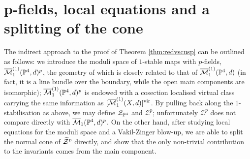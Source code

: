 \section{p-fields, local equations and a splitting of the cone}\label{sec:techniques}

The indirect approach to the proof of Theorem \ref{thm:redvscusp} can be outlined as follows: we introduce the moduli space of $1$-stable maps with $p$-fields, $\overline{\mathcal{M}}_1^{(1)}(\mathbb P^4,d)^p$, the geometry of which is closely related to that of $\overline{\mathcal{M}}_1^{(1)}(\mathbb P^4,d)$ (in fact, it is a line bundle over the boundary, while the open main components are isomorphic); $\overline{\mathcal{M}}_1^{(1)}(\mathbb P^4,d)^p$ is endowed with a cosection localised virtual class carrying the same information as $[\overline{\mathcal{M}}_1^{(1)}(X,d)]^{\mathrm{vir}}$. By pulling back along the $1$-stabilisation as above, we may define $\mathcal Z_{\mathbb P^4}$ and $\mathcal Z^p$; unfortunately $\mathcal Z^p$ does not compare directly with $\overline{\mathcal{M}}_1(\mathbb P^4,d)^p$. On the other hand, after studying local equations for the moduli space and a Vakil-Zinger blow-up, we are able to split the normal cone of $\widetilde{\mathcal Z}^p$ directly, and show that the only non-trivial contribution to the invariants comes from the main component.

